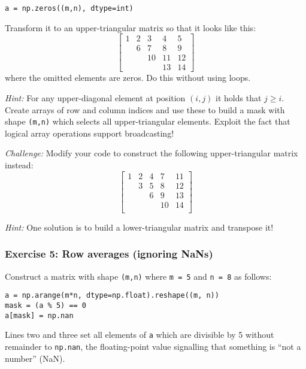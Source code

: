 \documentclass[10pt]{scrartcl}
\begin{document}
\begin{verbatim}
a = np.zeros((m,n), dtype=int)
\end{verbatim}

Transform it to an upper-triangular matrix so that it looks like this:
\[
\begin{bmatrix}
1 & 2 & 3 & 4 & 5 \\
 & 6 & 7 & 8 & 9 \\
  & & 10 & 11 & 12 \\
  & & & 13 & 14
\end{bmatrix}
\] where the omitted elements are zeros. Do this without using loops.

\emph{Hint:} For any upper-diagonal element at position \((i,j)\) it
holds that \(j \geq i\). Create arrays of row and column indices and use
these to build a mask with shape \texttt{(m,n)} which selects all
upper-triangular elements. Exploit the fact that logical array
operations support broadcasting!

\emph{Challenge:} Modify your code to construct the following
upper-triangular matrix instead: \[
\begin{bmatrix}
1 & 2 & 4 & 7 & 11 \\
  & 3 & 5 & 8 & 12 \\
  &   & 6 & 9 & 13 \\
  &   &   & 10 & 14 \\
\end{bmatrix}
\]

\emph{Hint:} One solution is to build a lower-triangular matrix and
transpose it!

    \hypertarget{exercise-5-row-averages-ignoring-nans}{%
\subsubsection{Exercise 5: Row averages (ignoring
NaNs)}\label{exercise-5-row-averages-ignoring-nans}}

Construct a matrix with shape \texttt{(m,n)} where \texttt{m\ =\ 5} and
\texttt{n\ =\ 8} as follows:

\begin{verbatim}
a = np.arange(m*n, dtype=np.float).reshape((m, n))
mask = (a % 5) == 0
a[mask] = np.nan
\end{verbatim}

Lines two and three set all elements of \texttt{a} which are divisible
by 5 without remainder to \texttt{np.nan}, the floating-point value
signalling that something is ``not a number'' (NaN).
\end{document}
